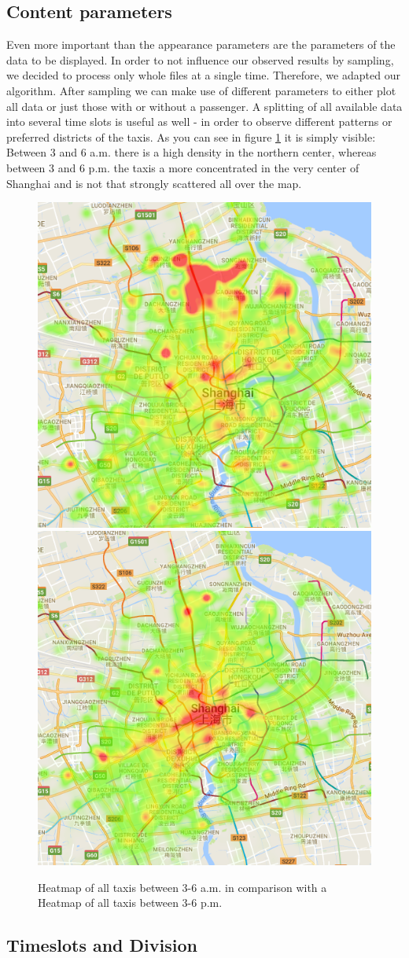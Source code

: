 \documentclass[11pt,conference,a4paper,twocolumns,romanappendices]{IEEEtran}
\begin{document}
\subsection{Content parameters}
Even more important than the appearance parameters are the parameters of the data to be displayed.
In order to not influence our observed results by sampling, we decided to process only whole files at a single time. Therefore, we adapted our algorithm.
After sampling we can make use of different parameters to either plot all data or just those with or without a passenger.
A splitting of all available data into several time slots is useful as well - in order to observe different patterns or preferred districts of the taxis.
As you can see in figure \ref{fig:allPass3to6} it is simply visible: Between 3 and 6 a.m. there is a high density in the northern center, whereas between 3 and 6 p.m. the taxis a more concentrated in the very center of Shanghai and is not that strongly scattered all over the map.

\begin{figure}
\begin{center}
\includegraphics[width=.3\textwidth]{3to6.png}
\includegraphics[width=.3\textwidth]{15to18.png}
\end{center}
\caption{\label{fig:allPass3to6}Heatmap of all taxis between 3-6 a.m. in comparison with a Heatmap of all taxis between 3-6 p.m.}
\end{figure}

\subsection{Timeslots and Division}
\end{document}

